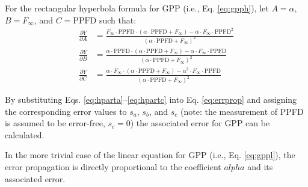 For the rectangular hyperbola formula for GPP (i.e., Eq. \ref{eq:gpph}), let $A = \alpha$, $B = F_{\infty}$, and $C = \text{PPFD}$ such that:
\begin{subequations}
\label{eq:hpartial}
\begin{align}
    \frac{\partial Y}{\partial A}&= \frac{F_{\infty} \cdot \text{PPFD} \cdot 
                                    \left( \alpha \cdot \text{PPFD} + F_{\infty} 
                                    \right) - \alpha \cdot F_{\infty} \cdot 
                                    \text{PPFD}^{2}}{\left(\alpha \cdot 
                                    \text{PPFD} + F_{\infty} \right)^{2}} 
                                    \label{eq:hparta}\\
    \frac{\partial Y}{\partial B}&= \frac{\alpha \cdot \text{PPFD} \cdot 
                                    \left( \alpha \cdot \text{PPFD} + F_{\infty} 
                                    \right) - \alpha \cdot F_{\infty} \cdot 
                                    \text{PPFD}}{\left(\alpha \cdot 
                                    \text{PPFD} + F_{\infty} \right)^{2}} 
                                    \label{eq:hpartb}\\
    \frac{\partial Y}{\partial C}&= \frac{\alpha \cdot F_{\infty} \cdot 
                                    \left( \alpha \cdot \text{PPFD} + F_{\infty} 
                                    \right) - \alpha^{2} \cdot F_{\infty} \cdot 
                                    \text{PPFD}}{\left(\alpha \cdot 
                                    \text{PPFD} + F_{\infty} \right)^{2}}  
                                    \label{eq:hpartc}
\end{align}
\end{subequations}

By substituting Eqs. \ref{eq:hparta}--\ref{eq:hpartc} into Eq. \ref{eq:errprop} and assigning the corresponding error values to $s_{a}$, $s_{b}$, and $s_{c}$ (note: the measurement of PPFD is assumed to be error-free, $s_{c} = 0$) the associated error for GPP can be calculated. 

In the more trivial case of the linear equation for GPP (i.e., Eq. \ref{eq:gppl}), the error propagation is directly proportional to the coefficient $alpha$ and its associated error.

